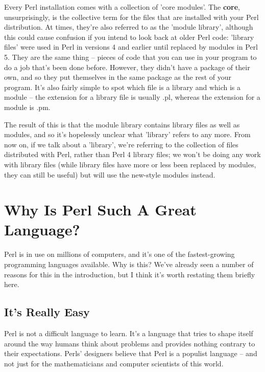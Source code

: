 \documentclass[a4paper,11pt]{book}
\begin{document}
\noindent 

\noindent Every Perl installation comes with a collection of 'core modules'. The \textbf{core}, unsurprisingly, is the collective term for the files that are installed with your Perl distribution. At times, they're also referred to as the 'module library', although this could cause confusion if you intend to look back at older Perl code: 'library files' were used in Perl in versions 4 and earlier until replaced by modules in Perl 5. They are the same thing -- pieces of code that you can use in your program to do a job that's been done before. However, they didn't have a package of their own, and so they put themselves in the same package as the rest of your program. It's also fairly simple to spot which file is a library and which is a module -- the extension for a library file is usually .pl, whereas the extension for a module is .pm.

\noindent 

\noindent The result of this is that the module library contains library files as well as modules, and so it's hopelessly unclear what 'library' refers to any more. From now on, if we talk about a 'library', we're referring to the collection of files distributed with Perl, rather than Perl 4 library files; we won't be doing any work with library files (while library files have more or less been replaced by modules, they can still be useful) but will use the new-style modules instead.

\noindent 

\section{Why Is Perl Such A Great Language?}

\noindent Perl is in use on millions of computers, and it's one of the fastest-growing programming languages available. Why is this? We've already seen a number of reasons for this in the introduction, but I think it's worth restating them briefly here.

\subsection{It's Really Easy}

\noindent Perl is not a difficult language to learn. It's a language that tries to shape itself around the way humans think about problems and provides nothing contrary to their expectations. Perls' designers believe that Perl is a populist language -- and not just for the mathematicians and computer scientists of this world.
\end{document}
